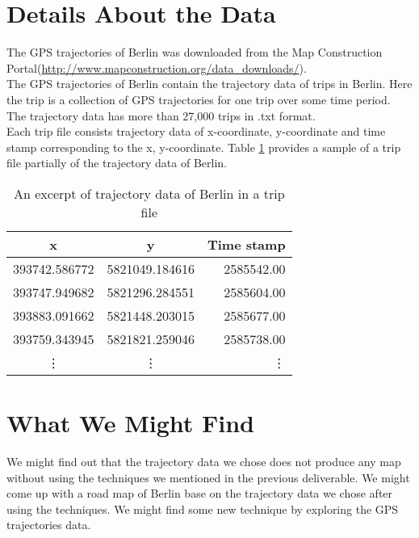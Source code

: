 \documentclass[11pt]{article}
\begin{document}
\section*{Details About the Data}
The GPS trajectories of Berlin was downloaded from the Map Construction Portal(\url{http://www.mapconstruction.org/data_downloads/}).  \\
The GPS trajectories of Berlin contain the trajectory data of trips in Berlin. Here the trip is a collection of GPS trajectories for one trip over some time period. The trajectory data has more than 27,000 trips in .txt format. \\
Each trip file consists trajectory data of x-coordinate, y-coordinate and time stamp corresponding to the x, y-coordinate. Table \ref{table:questions} provides a sample of a trip file partially of the trajectory data of Berlin.
\begin{table}
\begin{center}
\begin{tabular}{ |c |c| r| }
\hline
  x & y & Time stamp   \\ \hline
  393742.586772 & 5821049.184616 & 2585542.00   \\ \hline
  393747.949682 & 5821296.284551 & 2585604.00 \\  \hline
  393883.091662 & 5821448.203015 & 2585677.00  \\ \hline
  393759.343945 & 5821821.259046 & 2585738.00\\ \hline
  \vdots & \vdots & \vdots \\ \hline
\end{tabular}
\end{center}
\caption{An excerpt of trajectory data of Berlin in a trip file}
\label{table:questions}
\end{table}


\pagebreak
\section*{What We Might Find}
We might find out that the trajectory data we chose does not produce any map without using the techniques we mentioned in the previous deliverable. We might come up with a road map of Berlin base on the trajectory data we chose after using the techniques. We might find some new technique by exploring the GPS trajectories data. 
\end{document}
